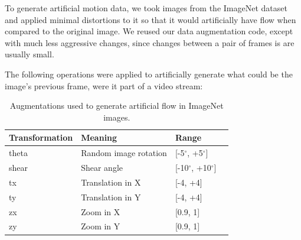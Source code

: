 \documentclass[12pt,openright,oneside,a4paper,english]{abntex2}
\begin{document}
\begin{otherlanguage}{english}
\label{artificial_flow}

To generate artificial motion data, we took images from the ImageNet dataset and applied minimal distortions to it so that it would artificially have flow when compared to the original image. We reused our data augmentation code, except with much less aggressive changes, since changes between a pair of frames is are usually small.

The following operations were applied to artificially generate what could be the image's previous frame, were it part of a video stream:

\begin{table}[H]
    \centering
    \begin{tabular}{llll}
    Transformation & Meaning               & Range          &  \\ \hline
    theta          & Random image rotation & [-5$^{\circ}$, +5$^{\circ}$]   &  \\
    shear          & Shear angle           & [-10$^{\circ}$, +10$^{\circ}$] &  \\ \hline
    tx             & Translation in X      & [-4, +4]       &  \\
    ty             & Translation in Y      & [-4, +4]       &  \\ \hline
    zx             & Zoom in X             & [0.9, 1]       &  \\
    zy             & Zoom in Y             & [0.9, 1]       &  \\ \hline
    \end{tabular}
    \label{table:augmentations_imagenet}
    \caption{Augmentations used to generate artificial flow in ImageNet images.}
\end{table}








\end{otherlanguage}
\end{document}
